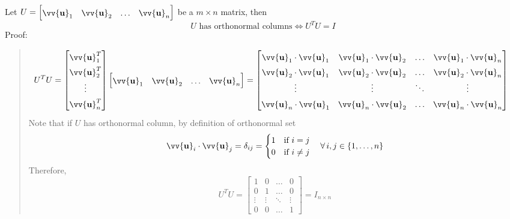 \documentclass[11pt]{article}
\DeclareRobustCommand{\myvec}[1]{\vv{\mathbf{#1}}}
\newcommand{\mymat}[1]{#1}
\newcommand{\dotprod}[2]{#1 \cdot #2}
\begin{document}
    Let $\mymat{U} = \begin{bmatrix} \myvec{u}_1 & \myvec{u}_2 & \dots & \myvec{u}_n \end{bmatrix}$ be a $m \times n$ matrix, then
    \begin{equation}
        \mymat{U}\text{ has orthonormal columns} \iff \mymat{U}^T \mymat{U} = \mymat{I}
    \end{equation}
    Proof:
    \begin{quote}
        \begin{align*}
            \renewcommand{\arraystretch}{1.5}
            \mymat{U}^{T} \mymat{U} = 
                \begin{bmatrix} \myvec{u}_1^T \\ \myvec{u}_2^T \\ \vdots \\ \myvec{u}_n^T \end{bmatrix}
                \begin{bmatrix} \myvec{u}_1 & \myvec{u}_2 & \dots & \myvec{u}_n \end{bmatrix}
                &= \begin{bmatrix}
                    \dotprod{\myvec{u}_1}{\myvec{u}_1} & \dotprod{\myvec{u}_1}{\myvec{u}_2} & \dots  & \dotprod{\myvec{u}_1}{\myvec{u}_n} \\
                    \dotprod{\myvec{u}_2}{\myvec{u}_1} & \dotprod{\myvec{u}_2}{\myvec{u}_2} & \dots  & \dotprod{\myvec{u}_2}{\myvec{u}_n} \\
                    \vdots & \vdots & \ddots & \vdots \\
                    \dotprod{\myvec{u}_n}{\myvec{u}_1} & \dotprod{\myvec{u}_n}{\myvec{u}_2} & \dots  & \dotprod{\myvec{u}_n}{\myvec{u}_n}
                \end{bmatrix}
        \end{align*}
        Note that if $\mymat{U}$ has orthonormal column, by definition of orthonormal set
        \begin{equation*}
            \dotprod{\myvec{u}_i}{\myvec{u}_j} = \delta_{ij} = \begin{cases}
                1 & \text{if } i = j \\
                0 & \text{if } i \ne j
            \end{cases} \quad \forall\,i, j \in \{1, \dots, n\}
        \end{equation*}
        Therefore,
        \begin{equation*}
            \mymat{U}^T\mymat{U} = \begin{bmatrix}
                1       & 0         & \dots     & 0 \\
                0       & 1         & \dots     & 0 \\
                \vdots  & \vdots    & \ddots    & \vdots \\
                0       & 0         & \dots     & 1 
            \end{bmatrix} = \mymat{I}_{n \times n}
        \end{equation*}
    \end{quote}
\end{document}
